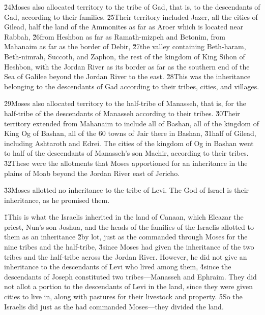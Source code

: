 \v{24}Moses also allocated territory to the tribe of Gad, that is, to the descendants of Gad, according to their families. \v{25}Their territory included Jazer, all the cities of Gilead, half the land of the Ammonites as far as Aroer which is located near Rabbah, \v{26}from Heshbon as far as Ramath-mizpeh and Betonim, from Mahanaim as far as the border of Debir, \v{27}the valley containing Beth-haram, Beth-nimrah, Succoth, and Zaphon, the rest of the kingdom of King Sihon of Heshbon, with the Jordan River as its border as far as the southern end of the Sea of Galilee beyond the Jordan River to the east. \v{28}This was the inheritance belonging to the descendants of Gad according to their tribes, cities, and villages.

\v{29}Moses also allocated territory to the half-tribe of Manasseh, that is, for the half-tribe of the descendants of Manasseh according to their tribes. \v{30}Their territory extended from Mahanaim to include all of Bashan, all of the kingdom of King Og of Bashan, all of the 60 towns of Jair there in Bashan, \v{31}half of Gilead, including Ashtaroth and Edrei. The cities of the kingdom of Og in Bashan went to half of the descendants of Manasseh's son Machir, according to their tribes. \v{32}These were the allotments that Moses apportioned for an inheritance in the plains of Moab beyond the Jordan River east of Jericho.

\v{33}Moses allotted no inheritance to the tribe of Levi. The  God of Israel is their inheritance, as he promised them.

\v{1}This is what the Israelis inherited in the land of Canaan, which Eleazar the priest, Nun's son Joshua, and the heads of the families of the Israelis allotted to them as an inheritance \v{2}by lot, just as the  commanded through Moses for the nine tribes and the half-tribe, \v{3}since Moses had given the inheritance of the two tribes and the half-tribe across the Jordan River. However, he did not give an inheritance to the descendants of Levi who lived among them, \v{4}since the descendants of Joseph constituted two tribes---Manasseh and Ephraim. They did not allot a portion to the descendants of Levi in the land, since they were given cities to live in, along with pastures for their livestock and property. \v{5}So the Israelis did just as the  had commanded Moses---they divided the land.


